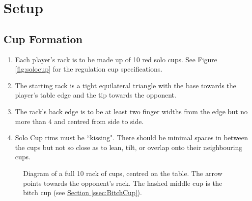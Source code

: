 \section{Setup}\label{sec:SETUP}
	\subsection{Cup Formation}\label{ssec:CupFormation}
		\begin{enumerate}[label=(\roman*), ref=\roman*]
            \item \label{sssec:CF,solocups} Each player's rack is to be made up of 10 red  solo cups.
                See \hyperref[fig:solocup]{Figure \ref*{fig:solocup}} for the regulation cup specifications. 
            \item \label{sssec:CF,triangle} The starting rack is a tight equilateral triangle with the base towards the player's table edge and the tip towards the opponent. 
            \item \label{sssec:CF,position} The rack's back edge is to be at least two finger widths from the edge but no more than 4 and centred from side to side. 
            \item \label{sssec:CF,kissing} Solo Cup rims must be ``kissing". There should be minimal spaces in between the cups but not so close as to lean, tilt, or overlap onto their neighbouring cups. 
        \end{enumerate}
        \begin{figure}[H]%
            \centering
            \def\svgwidth{0.4\columnwidth}
            
            \caption{Diagram of a full 10 rack of cups, centred on the table. The arrow points towards the opponent's rack. The hashed middle cup is the bitch cup (see \hyperref[ssec:BitchCup]{Section \ref*{ssec:BitchCup}}).}
            \label{fig:therack}
        \end{figure}
